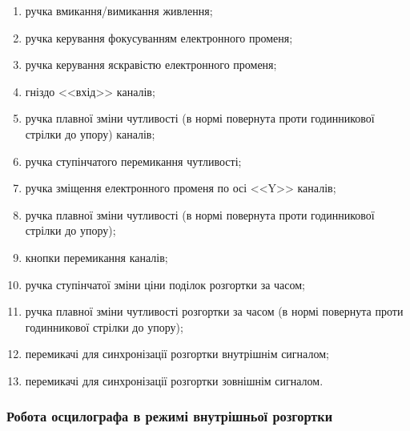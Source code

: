 \begin{enumerate}
    \item \label{btn:power} ручка вмикання/вимикання живлення;
    \item \label{btn:focus}ручка керування фокусуванням електронного променя;
    \item \label{btn:brightness} ручка керування яскравістю  електронного променя;
    \item \label{btn:gk} гніздо <<вхід>> каналів;
    \item \label{btn:pzch} ручка плавної зміни чутливості (в нормі повернута проти годинникової стрілки до упору) каналів;
    \item \label{btn:stch}ручка ступінчатого перемикання чутливості;
    \item \label{btn:YShift}ручка зміщення електронного променя по осі <<Y>> каналів;
    \item \label{btn:pzch2} ручка плавної зміни чутливості (в нормі повернута проти годинникової стрілки до упору);
    \item \label{btn:ChangeChanels} кнопки перемикання каналів;
    \item \label{btn:timestep}ручка ступінчатої зміни ціни поділок розгортки за часом;
    \item \label{btn:timestepsoft}ручка плавної зміни чутливості розгортки за часом  (в нормі повернута проти годинникової стрілки до упору);
    \item \label{btn:iternal}перемикачі для синхронізації розгортки внутрішнім сигналом;
    \item \label{btn:external}перемикачі для синхронізації розгортки зовнішнім сигналом.
\end{enumerate}

\subsubsection*{Робота осцилографа в режимі внутрішньої розгортки}

